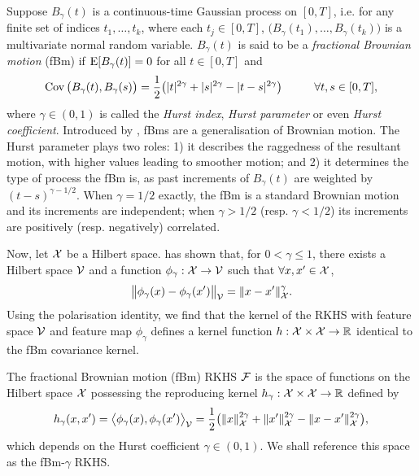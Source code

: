 Suppose $B_\gamma(t)$ is a continuous-time Gaussian process on $[0,T]$, i.e. for any finite set of indices $t_1,\dots,t_k$, where each $t_j \in [0,T]$, $\big(B_\gamma(t_1),\dots,B_\gamma(t_k)\big)$ is a multivariate normal random variable.
$B_\gamma(t)$ is said to be a \emph{fractional Brownian motion} (fBm) if $\operatorname{E} [B_\gamma(t)] = 0$ for all $t \in [0,T]$ and 
\vspace{-0.5em}
\[
  \operatorname{Cov}\big( B_\gamma(t),B_\gamma(s) \big) = \frac{1}{2}\big( |t|^{2\gamma} + |s|^{2\gamma} - |t-s|^{2\gamma} \big) \hspace{1cm} \forall t,s \in [0,T],
\]
where $\gamma \in (0,1)$ is called the \emph{Hurst index}, \emph{Hurst parameter} or even \emph{Hurst coefficient}.
Introduced by \citet{mandelbrot1968fractional}, fBms are a generalisation of Brownian motion.
The Hurst parameter plays two roles: 1) it describes the raggedness of the resultant motion, with higher values leading to smoother motion; and 2) it determines the type of process the fBm is, as past increments of $B_\gamma(t)$ are weighted by $(t-s)^{\gamma-1/2}$.
When $\gamma=1/2$ exactly, the fBm is a standard Brownian motion and its increments are independent; when $\gamma > 1/2$ (resp. $\gamma < 1/2$) its increments are positively (resp. negatively) correlated.

Now, let ${\mathcal X}$ be a Hilbert space. 
\citet[Theorem 3]{schoenberg1937} has shown that, for $0 < \gamma\leq 1$, there exists a Hilbert space ${\mathcal V}$ and a function $\phi_\gamma:{\mathcal X}\to{\mathcal V}$ such that $\forall x,x' \in {\mathcal X}$,
\[
  \big\Vert \phi_\gamma(x) - \phi_\gamma(x') \big\Vert_{\mathcal V} = \lVert x-x'\rVert_{\mathcal X}^\gamma.
\]
Using the polarisation identity, 
we find that the kernel of the RKHS with feature space ${\mathcal V}$ and feature map $\phi_\gamma$ defines a kernel function $h:{\mathcal X}\times{\mathcal X}\to\mathbb{R}$ identical to the fBm covariance kernel.

\begin{definition}\label{def:fbmrkhs}
  \hspace{-1.7pt}The fractional Brownian motion (fBm) RKHS ${\mathcal F}$ is the space of functions on the Hilbert space ${\mathcal X}$ possessing the reproducing kernel $h_\gamma:{\mathcal X}\times{\mathcal X}\to\mathbb{R}$ defined by
  \[
    h_\gamma(x,x') = \big\langle \phi_\gamma(x), \phi_\gamma(x') \big\rangle_{\mathcal V} = \frac{1}{2}\big( \lVert x\rVert_{\mathcal X}^{2\gamma} + \lVert x'\rVert_{\mathcal X}^{2\gamma} - \lVert x-x'\rVert_{\mathcal X}^{2\gamma} \big),
  \]
  which depends on the Hurst coefficient $\gamma \in (0,1)$.
  We shall reference this space as the fBm-$\gamma$ RKHS.
\end{definition}

